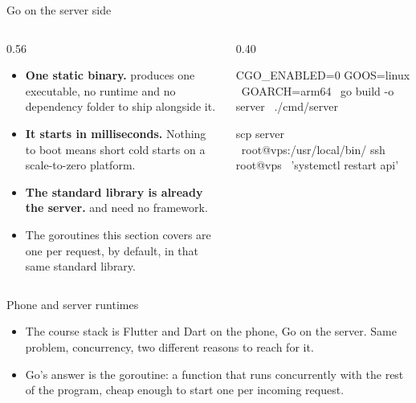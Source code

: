 \documentclass[10pt,aspectratio=169,t]{beamer}
\begin{document}
\begin{frame}[fragile,eyebrow=Goroutines]{Go on the server side}
  \begin{columns}[T]
    \begin{column}{0.56\textwidth}
      \begin{itemize}
        \item \textbf{One static binary.}  produces one executable, no runtime and no dependency folder to ship alongside it.
        \item \textbf{It starts in milliseconds.} Nothing to boot means short cold starts on a scale-to-zero platform.
        \item \textbf{The standard library is already the server.}  and  need no framework.
        \item The goroutines this section covers are one per request, by default, in that same standard library.
      \end{itemize}
    \end{column}
    \begin{column}{0.40\textwidth}
\begin{shell}
CGO_ENABLED=0 GOOS=linux \
  GOARCH=arm64 \
  go build -o server \
  ./cmd/server

scp server \
  root@vps:/usr/local/bin/
ssh root@vps \
  'systemctl restart api'
\end{shell}
    \end{column}
  \end{columns}
\end{frame}

\begin{frame}[eyebrow=Goroutines]{Phone and server runtimes}
  \vskip 2mm
  \begin{grid}[2]
  \end{grid}
  \vskip 5mm
  \begin{itemize}
    \item The course stack is Flutter and Dart on the phone, Go on the server. Same problem, concurrency, two different reasons to reach for it.
    \item Go's answer is the goroutine: a function that runs concurrently with the rest of the program, cheap enough to start one per incoming request.
  \end{itemize}
\end{frame}
\end{document}
